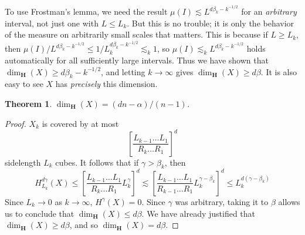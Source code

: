 \documentclass{article}
\theoremstyle{plain}
\theoremstyle{plain}
\newtheorem{theorem}{Theorem}
\begin{document}
To use Frostman's lemma, we need the result $\mu(I) \lesssim L^{d \beta_k - k^{-1/2}}$ for an {\it arbitrary} interval, not just one with $L \leq L_k$. But this is no trouble; it is only the behavior of the measure on arbitrarily small scales that matters. This is because if $L \geq L_k$, then $\mu(I)/L^{d \beta_k - k^{-1/2}} \leq 1/L_k^{d \beta_k - k^{-1/2}} \lesssim_k 1$, so $\mu(I) \lesssim_k L^{d \beta_k - k^{-1/2}}$ holds automatically for all sufficiently large intervals. Thus we have shown that $\dim_{\mathbf{H}}(X) \geq d \beta_k - k^{-1/2}$, and letting $k \to \infty$ gives $\dim_{\mathbf{H}}(X) \geq d \beta$. It is also easy to see $X$ has {\it precisely} this dimension.

\begin{theorem}
	$\dim_{\mathbf{H}}(X) = (dn - \alpha)/(n-1)$.
\end{theorem}
\begin{proof}
	$X_k$ is covered by at most
	\[ \left[ \frac{L_{k-1} \dots L_1}{R_k \dots R_1} \right]^d \]
	sidelength $L_k$ cubes. It follows that if $\gamma > \beta_k$, then
	\[ H^{d\gamma}_{L_k}(X) \leq \left[ \frac{L_{k-1} \dots L_1}{R_k \dots R_1} L_k^\gamma \right]^d \lesssim \left[ \frac{L_{k-1} \dots L_1}{R_{k-1} \dots R_1} L_k^{\gamma - \beta_k} \right]^d \leq L_k^{d(\gamma - \beta_k)} \]
	Since $L_k \to 0$ as $k \to \infty$, $H^\gamma(X) = 0$. Since $\gamma$ was arbitrary, taking it to $\beta$ allows us to conclude that $\dim_{\mathbf{H}}(X) \leq d \beta$. We have already justified that $\dim_{\mathbf{H}}(X) \geq d\beta$, and so $\dim_{\mathbf{H}}(X) = d \beta$.
\end{proof}


\end{document}
